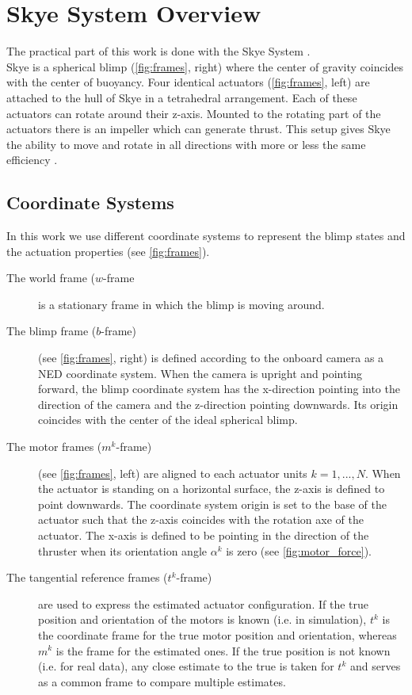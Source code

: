 \section{Skye System Overview}
The practical part of this work is done with the Skye System \citep{Skye2013}.\\
Skye is a spherical blimp (\cref{fig:frames}, right) where the center of gravity coincides with the center of buoyancy.
Four identical actuators (\cref{fig:frames}, left) are attached to the hull of Skye in a tetrahedral arrangement.
Each of these actuators can rotate around their z-axis.
Mounted to the rotating part of the actuators there is an impeller which can generate thrust.
This setup gives Skye the ability to move and rotate in all directions with more or less the same efficiency \citep[see][chap. 3]{Schaffner2012}.

\subsection{Coordinate Systems}
\label{sub:coordinate_systems}
In this work we use different coordinate systems to represent the blimp states and the actuation properties (see \cref{fig:frames}).
\begin{description}
\item[The world frame ($w$-frame] is a stationary frame in which the blimp is moving around.
\item[The blimp frame ($b$-frame)] (see \cref{fig:frames}, right) is defined according to the onboard camera as a NED coordinate system. 
When the camera is upright and pointing forward, the blimp coordinate system has the x-direction pointing into the direction of the camera and the z-direction pointing downwards.
Its origin coincides with the center of the ideal spherical blimp.
\item[The motor frames ($m^k$-frame)] (see \cref{fig:frames}, left) are aligned to each actuator units $k=1,...,N$.
When the actuator is standing on a horizontal surface, the z-axis is defined to point downwards.
The coordinate system origin is set to the base of the actuator such that the z-axis coincides with the rotation axe of the actuator.
The x-axis is defined to be pointing in the direction of the thruster when its orientation angle $\alpha^k$ is zero (see \cref{fig:motor_force}).
\item[The tangential reference frames ($t^k$-frame)] are used to express the estimated actuator configuration.
If the true position and orientation of the motors is known (i.e. in simulation), $t^k$ is the coordinate frame for the true motor position and orientation, whereas $m^k$ is the frame for the estimated ones.
If the true position is not known (i.e. for real data), any close estimate to the true is taken for $t^k$ and serves as a common frame to compare multiple estimates.
\end{description}


